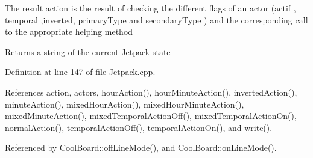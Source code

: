 The result action is the result of checking the different flags of an actor (actif , temporal ,inverted, primary\+Type and secondary\+Type ) and the corresponding call to the appropriate helping method

\begin{DoxyReturn}{Returns}
a string of the current \hyperlink{class_jetpack}{Jetpack} state 
\end{DoxyReturn}


Definition at line 147 of file Jetpack.\+cpp.



References action, actors, hour\+Action(), hour\+Minute\+Action(), inverted\+Action(), minute\+Action(), mixed\+Hour\+Action(), mixed\+Hour\+Minute\+Action(), mixed\+Minute\+Action(), mixed\+Temporal\+Action\+Off(), mixed\+Temporal\+Action\+On(), normal\+Action(), temporal\+Action\+Off(), temporal\+Action\+On(), and write().



Referenced by Cool\+Board\+::off\+Line\+Mode(), and Cool\+Board\+::on\+Line\+Mode().

